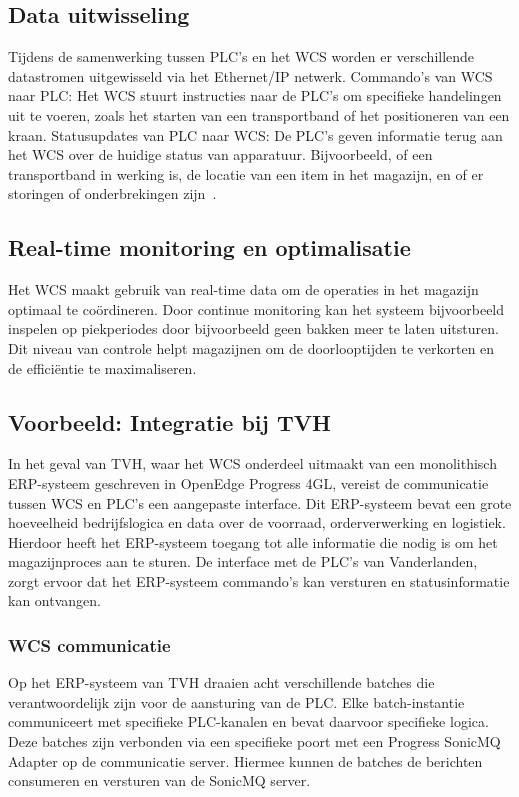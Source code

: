 \subsection{Data uitwisseling} 
Tijdens de samenwerking tussen PLC’s en het WCS worden er verschillende datastromen uitgewisseld via het Ethernet/IP netwerk.
Commando’s van WCS naar PLC: Het WCS stuurt instructies naar de PLC’s om specifieke handelingen uit te voeren, zoals het starten van een transportband of het positioneren van een kraan.
Statusupdates van PLC naar WCS: De PLC’s geven informatie terug aan het WCS over de huidige status van apparatuur. Bijvoorbeeld, of een transportband in werking is, 
de locatie van een item in het magazijn, en of er storingen of onderbrekingen zijn~\autocite{Laar2013}.

\subsection{Real-time monitoring en optimalisatie} 
Het WCS maakt gebruik van real-time data om de operaties in het magazijn optimaal te coördineren. 
Door continue monitoring kan het systeem bijvoorbeeld inspelen op piekperiodes door bijvoorbeeld geen bakken meer te laten uitsturen. 
Dit niveau van controle helpt magazijnen om de doorlooptijden te verkorten en de efficiëntie te maximaliseren.

\subsection{Voorbeeld: Integratie bij TVH} 
In het geval van TVH, waar het WCS onderdeel uitmaakt van een monolithisch ERP-systeem geschreven in OpenEdge Progress 4GL, 
vereist de communicatie tussen WCS en PLC’s een aangepaste interface. 
Dit ERP-systeem bevat een grote hoeveelheid bedrijfslogica en data over de voorraad, orderverwerking en logistiek.
Hierdoor heeft het ERP-systeem toegang tot alle informatie die nodig is om het magazijnproces aan te sturen. 
De interface met de PLC’s van Vanderlanden, zorgt ervoor dat het ERP-systeem commando’s kan versturen en statusinformatie kan ontvangen. 

\subsubsection{WCS communicatie} 
Op het ERP-systeem van TVH draaien acht verschillende batches die verantwoordelijk zijn voor de aansturing van de PLC. 
Elke batch-instantie communiceert met specifieke PLC-kanalen en bevat daarvoor specifieke logica.
Deze batches zijn verbonden via een specifieke poort met een Progress SonicMQ Adapter op de communicatie server.
Hiermee kunnen de batches de berichten consumeren en versturen van de SonicMQ server.

